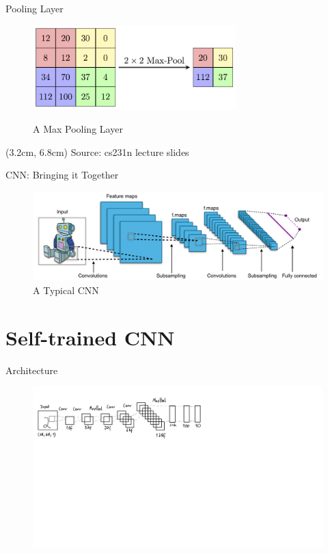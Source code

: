 \documentclass[citestyle=authoryear,bibstyle=numeric,hyperref,backend=biber]{sdqbeamer}
\begin{document}
\begin{frame}{Pooling Layer}
    \begin{figure}
        \centering
        \includegraphics[width=0.7\textwidth]{pictures/Maxpool_sample.png}
        \label{fig:conv_layer}
        \caption{A Max Pooling Layer}
    \end{figure}
    \begin{textblock*}{6cm}(3.2cm, 6.8cm) %
             \tiny{Source: cs231n lecture slides}
    \end{textblock*}
\end{frame}

\begin{frame}{CNN: Bringing it Together}
    \begin{figure}
        \centering
        \includegraphics[width=1\textwidth]{pictures/typical_cnn.png}
        \caption{A Typical CNN}
        \label{fig:typical-CNN}
    \end{figure}
\end{frame}


\section{Self-trained CNN}

\begin{frame}{Architecture}
    \begin{figure}
        \centering
        \includegraphics[width=1.75\textwidth]{pictures/architecture_self_trained_new.png}
        \label{fig:self_trained_conv}
    \end{figure}
\end{frame}
\end{document}
